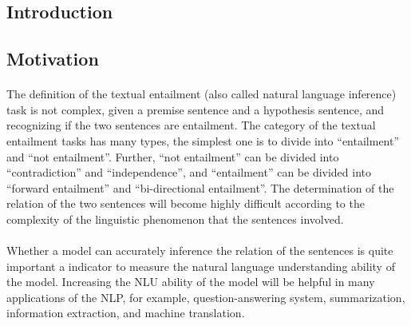 \documentclass[12pt]{article}
\begin{document}
\begin{CJK*}{UTF8}{bkai}

\newpage

\doublespacing
\tableofcontents
\singlespacing

\newpage

\listoffigures
\listoftables

\newpage


\begin{spacing}{1.77}
\section{Introduction} \label{section:introduction}

\subsection{Motivation}
\paragraph{}
The definition of the textual entailment (also called natural language inference) task is not complex, given a premise sentence and a hypothesis sentence, and recognizing if the two sentences are entailment. The category of the textual entailment tasks has many types, the simplest one is to divide into ``entailment'' and ``not entailment''. Further, ``not entailment'' can be divided into ``contradiction'' and ``independence'', and ``entailment'' can be divided into ``forward entailment'' and ``bi-directional entailment''. The determination of the relation of the two sentences will become highly difficult according to the complexity of the linguistic phenomenon that the sentences involved.

\paragraph{}
Whether a model can accurately inference the relation of the sentences is quite important a indicator to measure the natural language understanding ability of the model. Increasing the NLU ability of the model will be helpful in many applications of the NLP, for example, question-answering system, summarization, information extraction, and machine translation.


\end{spacing}
\end{CJK*}
\end{document}
